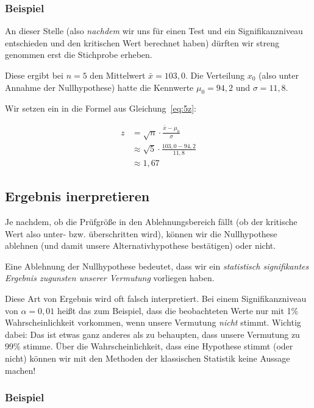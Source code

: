 \documentclass[
  11pt,
  ngerman,
  a4paper,
]{report}
\begin{document}
\hypertarget{beispiel-4}{%
\subsubsection{Beispiel}\label{beispiel-4}}

An dieser Stelle (also \emph{nachdem} wir uns für einen Test und ein Signifikanzniveau entschieden und den kritischen Wert berechnet haben) dürften wir streng genommen erst die Stichprobe erheben.

Diese ergibt bei \(n=5\) den Mittelwert \(\bar{x}=103{,}0\). Die Verteilung \(x_0\) (also unter Annahme der Nullhypothese) hatte die Kennwerte \(\mu_0=94{,}2\) und \(\sigma=11{,}8\).

Wir setzen ein in die Formel aus Gleichung~\eqref{eq:5z}:

\[\begin{aligned}
z&=\sqrt{n}\cdot\frac{\bar{x}-\mu_0}{\sigma}\\[4pt]
 &\approx\sqrt{5}\cdot\frac{103{,}0-94{,}2}{11{,}8}\\[4pt]
 &\approx1{,}67
\end{aligned}\]

\hypertarget{ergebnis-inerpretieren}{%
\subsection{Ergebnis inerpretieren}\label{ergebnis-inerpretieren}}

Je nachdem, ob die Prüfgröße in den Ablehnungsbereich fällt (ob der kritische Wert also unter- bzw. überschritten wird), können wir die Nullhypothese ablehnen (und damit unsere Alternativhypothese bestätigen) oder nicht.

Eine Ablehnung der Nullhypothese bedeutet, dass wir ein \emph{statistisch signifikantes Ergebnis zugunsten unserer Vermutung} vorliegen haben.

Diese Art von Ergebnis wird oft falsch interpretiert. Bei einem Signifikanzniveau von \(\alpha=0{,}01\) heißt das zum Beispiel, dass die beobachteten Werte nur mit 1\% Wahrscheinlichkeit vorkommen, wenn unsere Vermutung \emph{nicht} stimmt. Wichtig dabei: Das ist etwas ganz anderes als zu behaupten, dass unsere Vermutung zu 99\% stimme. Über die Wahrscheinlichkeit, dass eine Hypothese stimmt (oder nicht) können wir mit den Methoden der klassischen Statistik keine Aussage machen!

\hypertarget{beispiel-5}{%
\subsubsection{Beispiel}\label{beispiel-5}}
\end{document}
